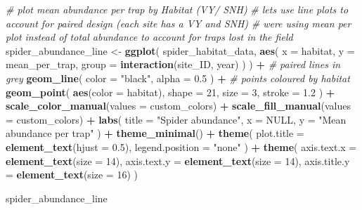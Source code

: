 \documentclass[
]{article}
\newenvironment{Shaded}{\begin{snugshade}}{\end{snugshade}}
\newcommand{\AttributeTok}[1]{\textcolor[rgb]{0.13,0.29,0.53}{#1}}
\newcommand{\CommentTok}[1]{\textcolor[rgb]{0.56,0.35,0.01}{\textit{#1}}}
\newcommand{\ConstantTok}[1]{\textcolor[rgb]{0.56,0.35,0.01}{#1}}
\newcommand{\DecValTok}[1]{\textcolor[rgb]{0.00,0.00,0.81}{#1}}
\newcommand{\FloatTok}[1]{\textcolor[rgb]{0.00,0.00,0.81}{#1}}
\newcommand{\FunctionTok}[1]{\textcolor[rgb]{0.13,0.29,0.53}{\textbf{#1}}}
\newcommand{\NormalTok}[1]{#1}
\newcommand{\OtherTok}[1]{\textcolor[rgb]{0.56,0.35,0.01}{#1}}
\newcommand{\SpecialCharTok}[1]{\textcolor[rgb]{0.81,0.36,0.00}{\textbf{#1}}}
\newcommand{\StringTok}[1]{\textcolor[rgb]{0.31,0.60,0.02}{#1}}
\begin{document}
\begin{Shaded}
\begin{Highlighting}[]
\CommentTok{\# plot mean abundance per trap by Habitat (VY/ SNH)}
\CommentTok{\# lets use line plots to account for paired design (each site has a VY and SNH)}
\CommentTok{\# we\textquotesingle{}re using mean per plot instead of total abundance to account for traps lost in the field}
\NormalTok{spider\_abundance\_line }\OtherTok{\textless{}{-}} \FunctionTok{ggplot}\NormalTok{(}
\NormalTok{  spider\_habitat\_data,}
  \FunctionTok{aes}\NormalTok{(}
    \AttributeTok{x =}\NormalTok{ habitat,}
    \AttributeTok{y =}\NormalTok{ mean\_per\_trap,}
    \AttributeTok{group =} \FunctionTok{interaction}\NormalTok{(site\_ID, year)}
\NormalTok{  )}
\NormalTok{) }\SpecialCharTok{+}
  \CommentTok{\# paired lines in grey}
  \FunctionTok{geom\_line}\NormalTok{(}
    \AttributeTok{color =} \StringTok{"black"}\NormalTok{,}
    \AttributeTok{alpha =} \FloatTok{0.5}
\NormalTok{  ) }\SpecialCharTok{+}
  \CommentTok{\# points coloured by habitat}
  \FunctionTok{geom\_point}\NormalTok{(}
    \FunctionTok{aes}\NormalTok{(}\AttributeTok{color =}\NormalTok{ habitat),}
    \AttributeTok{shape =} \DecValTok{21}\NormalTok{,}
    \AttributeTok{size =} \DecValTok{3}\NormalTok{,}
    \AttributeTok{stroke =} \FloatTok{1.2}
\NormalTok{  ) }\SpecialCharTok{+}
  \FunctionTok{scale\_color\_manual}\NormalTok{(}\AttributeTok{values =}\NormalTok{ custom\_colors) }\SpecialCharTok{+}
  \FunctionTok{scale\_fill\_manual}\NormalTok{(}\AttributeTok{values =}\NormalTok{ custom\_colors) }\SpecialCharTok{+}
  \FunctionTok{labs}\NormalTok{(}
    \AttributeTok{title =} \StringTok{"Spider abundance"}\NormalTok{,}
    \AttributeTok{x =} \ConstantTok{NULL}\NormalTok{,}
    \AttributeTok{y =} \StringTok{"Mean abundance per trap"}
\NormalTok{  ) }\SpecialCharTok{+}
  \FunctionTok{theme\_minimal}\NormalTok{() }\SpecialCharTok{+}
  \FunctionTok{theme}\NormalTok{(}
    \AttributeTok{plot.title =} \FunctionTok{element\_text}\NormalTok{(}\AttributeTok{hjust =} \FloatTok{0.5}\NormalTok{),}
    \AttributeTok{legend.position =} \StringTok{"none"}
\NormalTok{  ) }\SpecialCharTok{+} \FunctionTok{theme}\NormalTok{(}
  \AttributeTok{axis.text.x  =} \FunctionTok{element\_text}\NormalTok{(}\AttributeTok{size =} \DecValTok{14}\NormalTok{),}
  \AttributeTok{axis.text.y  =} \FunctionTok{element\_text}\NormalTok{(}\AttributeTok{size =} \DecValTok{14}\NormalTok{),}
  \AttributeTok{axis.title.y =} \FunctionTok{element\_text}\NormalTok{(}\AttributeTok{size =} \DecValTok{16}\NormalTok{)}
\NormalTok{)}


\NormalTok{spider\_abundance\_line}
\end{Highlighting}
\end{Shaded}
\end{document}
